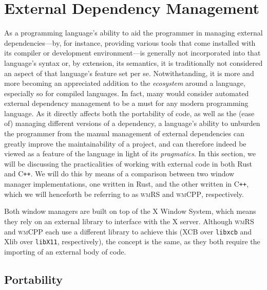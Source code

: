 \section{External Dependency Management}

As a programming  language's ability to aid the programmer  in managing external
dependencies---by,  for instance,  providing various  tools that  come installed
with  its compiler  or development  environment---is generally  not incorporated
into that language's syntax or, by extension, its semantics, it is traditionally
not considered an aspect of that language's feature set per se. Notwithstanding,
it is more  and more becoming an appreciated addition  to the \textit{ecosystem}
around a  language, especially so  for compiled  languages. In fact,  many would
consider automated  external dependency management to  be a must for  any modern
programming language.  As it directly affects  both the portability of  code, as
well as the (ease of) managing  different versions of a dependency, a language's
ability  to unburden  the  programmer  from the  manual  management of  external
dependencies  can greatly  improve the  maintainability  of a  project, and  can
therefore  indeed be  viewed  as a  feature  of  the language  in  light of  its
\textit{pragmatics}. In this  section, we will be  discussing the practicalities
of working with external code in both  Rust and C\texttt{++}. We will do this by
means of a comparison between two window manager implementations, one written in
Rust,  and the  other  written  in C\texttt{++},  which  we  will henceforth  be
referring to as \textsc{wmRS} and \textsc{wmCPP}, respectively.

Both  window managers  are built  on top  of the  X Window  System, which  means
they  rely on  an external  library  to interface  with the  X server.  Although
\textsc{wmRS} and  \textsc{wmCPP} each use  a different library to  achieve this
(XCB  over \texttt{libxcb}  and  Xlib over  \texttt{libX11}, respectively),  the
concept is the same,  as they both require the importing of  an external body of
code.

\subsection{Portability}

